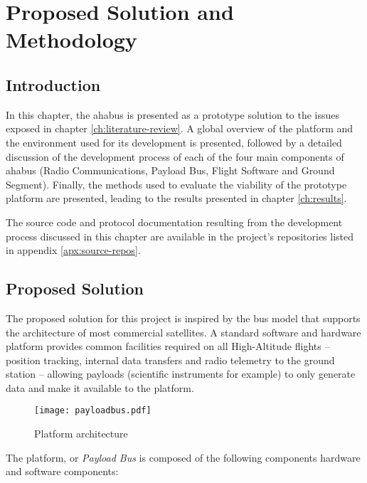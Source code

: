 \chapter{Proposed Solution and Methodology}
\label{ch:methodology}

\section{Introduction}

In this chapter, the \acrfull{ahabus} is presented as a prototype solution to the issues exposed in chapter \ref{ch:literature-review}. A global overview of the platform and the environment used for its development is presented, followed by a detailed discussion of the development process of each of the four main components of \acrshort{ahabus} (Radio Communications, Payload Bus, Flight Software and Ground Segment). Finally, the methods used to evaluate the viability of the prototype platform are presented, leading to the results presented in chapter \ref{ch:results}.

The source code and protocol documentation resulting from the development process discussed in this chapter are available in the project's repositories listed in appendix \ref{apx:source-repos}.

\section{Proposed Solution}

The proposed solution for this project is inspired by the bus model that
supports the architecture of most commercial satellites. A standard software
and hardware platform provides common facilities required on all High-Altitude
flights – position tracking, internal data transfers and radio telemetry to
the ground station – allowing payloads (scientific instruments for example) to
only generate data and make it available to the platform.

\begin{figure}[H]
\texttt{[image: payloadbus.pdf]}
\centering
\caption{Platform architecture}
\end{figure}

The platform, or \textit{Payload Bus} is composed of the following components 
hardware and software components:

